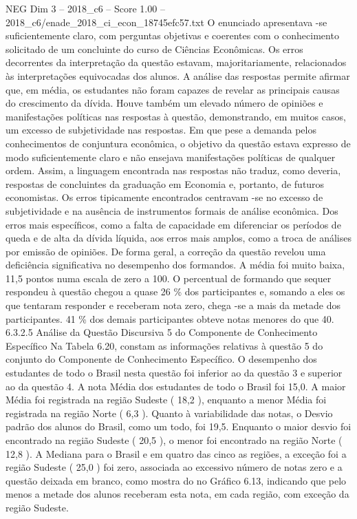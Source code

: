\begin{textsample}{NEG Dim 3 – 2018\_c6 – Score 1.00 – 2018\_c6/enade\_2018\_ci\_econ\_18745efc57.txt}
O enunciado apresentava -se suficientemente claro, com perguntas objetivas e coerentes com o conhecimento solicitado de um concluinte do curso de Ciências Econômicas.
Os erros decorrentes da interpretação da questão estavam, majoritariamente, relacionados às interpretações equivocadas dos alunos.
A análise das respostas permite afirmar que, em média, os estudantes não foram capazes de revelar as principais causas do crescimento da dívida.
Houve também um elevado número de opiniões e manifestações políticas nas respostas à questão, demonstrando, em muitos casos, um excesso de subjetividade nas respostas.
Em que pese a demanda pelos conhecimentos de conjuntura econômica, o objetivo da questão estava expresso de modo suficientemente claro e não ensejava manifestações políticas de qualquer ordem.
Assim, a linguagem encontrada nas respostas não traduz, como deveria, respostas de concluintes da graduação em Economia e, portanto, de futuros economistas.
Os erros tipicamente encontrados centravam -se no excesso de subjetividade e na ausência de instrumentos formais de análise econômica.
Dos erros mais específicos, como a falta de capacidade em diferenciar os períodos de queda e de alta da dívida líquida, aos erros mais amplos, como a troca de análises por emissão de opiniões.
De forma geral, a correção da questão revelou uma deficiência significativa no desempenho dos formandos.
A média foi muito baixa, 11,5 pontos numa escala de zero a 100.
O percentual de formando que sequer respondeu à questão chegou a quase 26 \% dos participantes e, somando a eles os que tentaram responder e receberam nota zero, chega -se a mais da metade dos participantes. 41 \% dos demais participantes obteve notas menores do que 40. 6.3.2.5 Análise da Questão Discursiva 5 do Componente de Conhecimento Específico Na Tabela 6.20, constam as informações relativas à questão 5 do conjunto do Componente de Conhecimento Específico.
O desempenho dos estudantes de todo o Brasil nesta questão foi inferior ao da questão 3 e superior ao da questão 4.
A nota Média dos estudantes de todo o Brasil foi 15,0.
A maior Média foi registrada na região Sudeste ( 18,2 ), enquanto a menor Média foi registrada na região Norte ( 6,3 ).
Quanto à variabilidade das notas, o Desvio padrão dos alunos do Brasil, como um todo, foi 19,5.
Enquanto o maior desvio foi encontrado na região Sudeste ( 20,5 ), o menor foi encontrado na região Norte ( 12,8 ).
A Mediana para o Brasil e em quatro das cinco as regiões, a exceção foi a região Sudeste ( 25,0 ) foi zero, associada ao excessivo número de notas zero e a questão deixada em branco, como mostra do no Gráfico 6.13, indicando que pelo menos a metade dos alunos receberam esta nota, em cada região, com exceção da região Sudeste.

\end{textsample}
